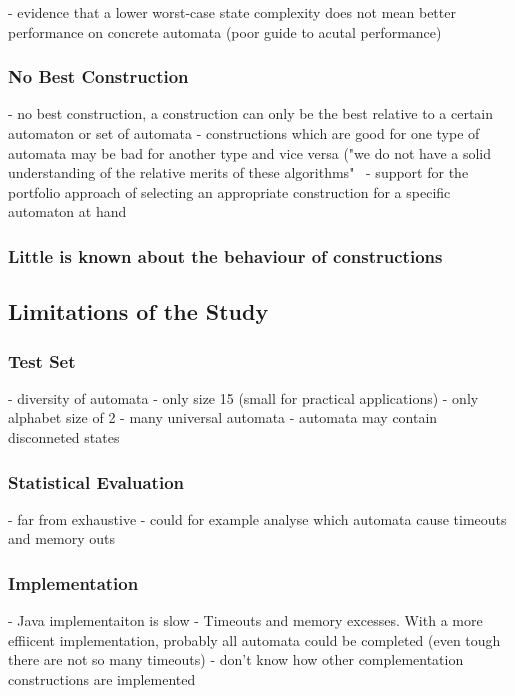 - evidence that a lower worst-case state complexity does not mean better performance on concrete automata (poor guide to acutal performance)


\subsubsection{No Best Construction}
- no best construction, a construction can only be the best relative to a certain automaton or set of automata
- constructions which are good for one type of automata may be bad for  another type and vice versa ("we do not have a solid understanding of the relative merits of these algorithms"~\cite{2007_vardi_model_checking}
- support for the portfolio approach of selecting an appropriate construction for a specific automaton at hand~\cite{2007_vardi_model_checking}

\subsubsection{Little is known about the behaviour of constructions}














\subsection{Limitations of the Study}
\label{5_limitations}

\subsubsection{Test Set}
- diversity of automata
    - only size 15 (small for practical applications)
    - only alphabet size of 2
- many universal automata
- automata may contain disconneted states



\subsubsection{Statistical Evaluation}
- far from exhaustive
- could for example analyse which automata cause timeouts and memory outs


\subsubsection{Implementation}
- Java implementaiton is slow
    - Timeouts and memory excesses. With a more effiicent implementation, probably all automata could be completed (even tough there are not so many timeouts)
- don't know how other complementation constructions are implemented







